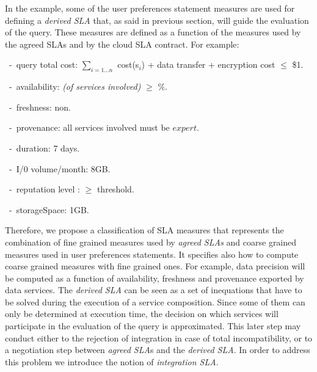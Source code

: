 In the example, some of the user preferences statement measures are used for defining a {\em derived SLA} that, as said in previous section, will guide the evaluation of the query. 
These measures are defined as a function of the measures used by the agreed SLAs and by the cloud SLA contract. For example: 
\begin{trivlist}\sf\footnotesize
 \item[~-~query total cost:] $\sum_{i = 1\dots n}$ cost(s$_i$) + data transfer + encryption cost $\leq$ \$1.
 \item[~-~availability:] {\em (of services involved)} $\geq$ {$\%$}.
 \item[~-~freshness:] non.
 \item[~-~provenance:] all services involved must be $expert$.
 \item[~-~duration:] 7 days.
 \item[~-~I/0 volume/month:] 8GB.
 \item[~-~reputation level :] $\geq$ threshold.
 \item[~-~storageSpace:] 1GB.
 \end{trivlist} 
 
Therefore, we propose a classification of SLA measures that represents the combination of fine grained measures used by {\em agreed SLAs} and coarse grained measures used in user preferences statements. 
It specifies also how to compute coarse grained measures with fine grained ones. 
For example, data precision will be computed as a function of availability, freshness and provenance exported by data services. The {\em derived SLA} can be seen as a set of inequations that have to be solved during the execution of a service composition. Since some of them can only be determined at execution time, the decision on which services will participate in the evaluation of the query is approximated.  
This later step may conduct either to the rejection of integration in case of total incompatibility, or to a negotiation step between {\em agreed SLA}s and the {\em derived SLA}. In order to address this problem we introduce the notion of  {\em integration SLA}. 
 
 

